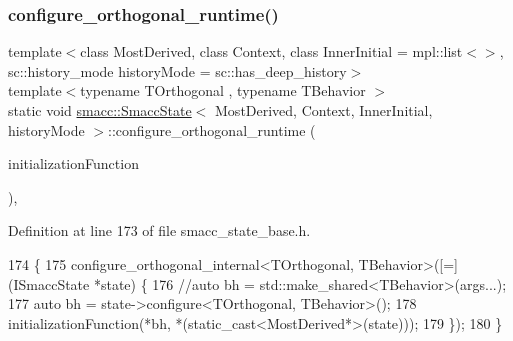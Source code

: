 \subsubsection{\texorpdfstring{configure\+\_\+orthogonal\+\_\+runtime()}{configure\_orthogonal\_runtime()}\hspace{0.1cm}{\footnotesize\ttfamily [1/2]}}
{\footnotesize\ttfamily template$<$class Most\+Derived, class Context, class Inner\+Initial = mpl\+::list$<$$>$, sc\+::history\+\_\+mode history\+Mode = sc\+::has\+\_\+deep\+\_\+history$>$ \\
template$<$typename T\+Orthogonal , typename T\+Behavior $>$ \\
static void \hyperlink{classsmacc_1_1SmaccState}{smacc\+::\+Smacc\+State}$<$ Most\+Derived, Context, Inner\+Initial, history\+Mode $>$\+::configure\+\_\+orthogonal\+\_\+runtime (\begin{DoxyParamCaption}\item[{std\+::function$<$ void(T\+Behavior \&bh, Most\+Derived \&)$>$}]{initialization\+Function }\end{DoxyParamCaption})\hspace{0.3cm}{\ttfamily [inline]}, {\ttfamily [static]}}



Definition at line 173 of file smacc\+\_\+state\+\_\+base.\+h.


\begin{DoxyCode}
174     \{
175       configure\_orthogonal\_internal<TOrthogonal, TBehavior>([=](ISmaccState *state) \{
176         \textcolor{comment}{//auto bh = std::make\_shared<TBehavior>(args...);}
177         \textcolor{keyword}{auto} bh = state->configure<TOrthogonal, TBehavior>();
178         initializationFunction(*bh, *(static\_cast<MostDerived*>(state)));
179       \});
180     \}
\end{DoxyCode}
\mbox{\label{classsmacc_1_1SmaccState_afe48d925910d9c691324ac3159a1bf10}} 
